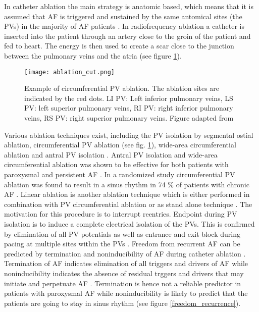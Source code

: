 \documentclass[type=dr, dr=rernat, accentcolor=tud7b,colorbacktitle, bigchapter, openright, twoside, 12pt ]{tudthesis}
\begin{document}
In catheter ablation the main strategy is anatomic based, which means that it is assumed that AF is triggered and sustained by the same 
antomical sites (the PVs) in the majority of AF patients \cite{CE09}. In radiofrequency ablation a catheter is inserted into the patient 
through an artery close to the groin of the patient and fed to heart. The energy is then used to create a scar close to the junction between 
the pulmonary veins and the atria (see figure \ref{af_circ}).\newline

\begin{figure}[H]
\begin{center}
\texttt{[image: ablation\_cut.png]}
\caption{Example of circumferential PV ablation. The ablation sites are indicated by the red dots. LI PV: Left inferior pulmonary veins, 
LS PV: left superior pulmonary veins, RI PV: right inferior pulmonary veins, RS PV: right superior pulmonary veins. Figure adapted 
from \cite{Ora06}}
\label{af_circ}
\end{center}
\end{figure}

Various ablation techniques exist, including the PV isolation by segmental ostial ablation, circumferential PV ablation (see 
fig. \ref{af_circ}), wide-area circumferential ablation and antral PV isolation \cite{Ora06} \cite{Ora03} \cite{Ouy04}. Antral PV isolation 
and wide-area circumferential ablation was shown to be effective for both patients with paroxysmal and persistent AF \cite{CE09} \cite{Ora03}. 
In a randomized study circumferential PV ablation was found to result in a sinus rhythm in 74 \% of patients with chronic AF \cite{Ora06}. 
Linear ablation is another ablation technique which is either performed in combination with PV circumferential ablation or as stand alone 
technique \cite{CE09}. The motivation for this procedure is to interrupt reentries.\newline
\newline
Endpoint during PV isolation is to induce a complete electrical isolation of the PVs. This is confirmed by elimination of all PV potentials 
as well as entrance and exit block during pacing at multiple sites within the PVs \cite{CE09}. Freedom from recurrent AF can be predicted by 
termination and noninducibility of AF during catheter ablation \cite{Ora02} \cite{Ora06} \cite{Hai05} \cite{Hai04} \cite{Ora04}. Termination 
of AF indicates elimination of all triggers and drivers of AF while noninducibility indicates the absence of residual trggers and drivers 
that may initiate and perpetuate AF \cite{CE09}. Termination is hence not a reliable predictor in patients with paroxysmal AF while 
noninducibility is likely to predict that the patients are going to stay in sinus rhythm (see figure \ref{freedom_recurrence}). 
\end{document}
